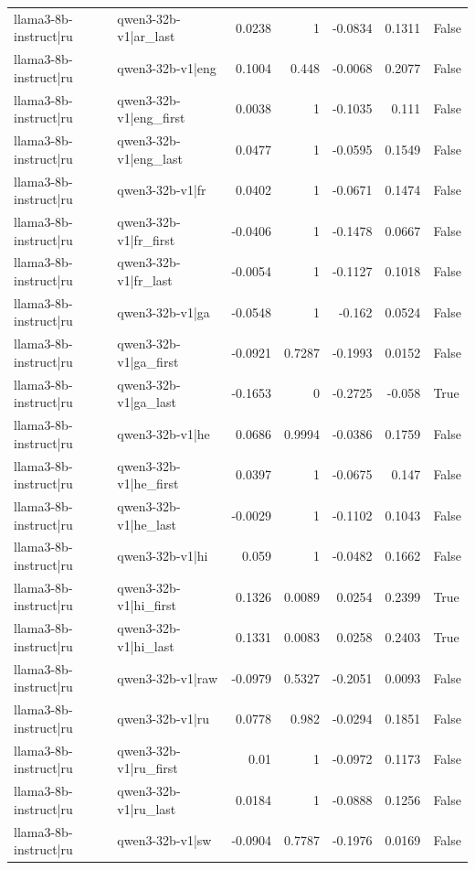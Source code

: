 \begin{table}
\begin{tabular}{l l r r r r l}
llama3-8b-instruct|ru & qwen3-32b-v1|ar_last & 0.0238 & 1 & -0.0834 & 0.1311 & False \\
llama3-8b-instruct|ru & qwen3-32b-v1|eng & 0.1004 & 0.448 & -0.0068 & 0.2077 & False \\
llama3-8b-instruct|ru & qwen3-32b-v1|eng_first & 0.0038 & 1 & -0.1035 & 0.111 & False \\
llama3-8b-instruct|ru & qwen3-32b-v1|eng_last & 0.0477 & 1 & -0.0595 & 0.1549 & False \\
llama3-8b-instruct|ru & qwen3-32b-v1|fr & 0.0402 & 1 & -0.0671 & 0.1474 & False \\
llama3-8b-instruct|ru & qwen3-32b-v1|fr_first & -0.0406 & 1 & -0.1478 & 0.0667 & False \\
llama3-8b-instruct|ru & qwen3-32b-v1|fr_last & -0.0054 & 1 & -0.1127 & 0.1018 & False \\
llama3-8b-instruct|ru & qwen3-32b-v1|ga & -0.0548 & 1 & -0.162 & 0.0524 & False \\
llama3-8b-instruct|ru & qwen3-32b-v1|ga_first & -0.0921 & 0.7287 & -0.1993 & 0.0152 & False \\
llama3-8b-instruct|ru & qwen3-32b-v1|ga_last & -0.1653 & 0 & -0.2725 & -0.058 & True \\
llama3-8b-instruct|ru & qwen3-32b-v1|he & 0.0686 & 0.9994 & -0.0386 & 0.1759 & False \\
llama3-8b-instruct|ru & qwen3-32b-v1|he_first & 0.0397 & 1 & -0.0675 & 0.147 & False \\
llama3-8b-instruct|ru & qwen3-32b-v1|he_last & -0.0029 & 1 & -0.1102 & 0.1043 & False \\
llama3-8b-instruct|ru & qwen3-32b-v1|hi & 0.059 & 1 & -0.0482 & 0.1662 & False \\
llama3-8b-instruct|ru & qwen3-32b-v1|hi_first & 0.1326 & 0.0089 & 0.0254 & 0.2399 & True \\
llama3-8b-instruct|ru & qwen3-32b-v1|hi_last & 0.1331 & 0.0083 & 0.0258 & 0.2403 & True \\
llama3-8b-instruct|ru & qwen3-32b-v1|raw & -0.0979 & 0.5327 & -0.2051 & 0.0093 & False \\
llama3-8b-instruct|ru & qwen3-32b-v1|ru & 0.0778 & 0.982 & -0.0294 & 0.1851 & False \\
llama3-8b-instruct|ru & qwen3-32b-v1|ru_first & 0.01 & 1 & -0.0972 & 0.1173 & False \\
llama3-8b-instruct|ru & qwen3-32b-v1|ru_last & 0.0184 & 1 & -0.0888 & 0.1256 & False \\
llama3-8b-instruct|ru & qwen3-32b-v1|sw & -0.0904 & 0.7787 & -0.1976 & 0.0169 & False \\

\end{tabular}
\end{table}
